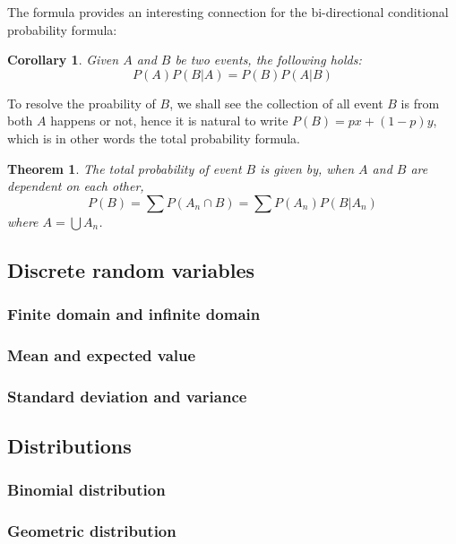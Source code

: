 \documentclass[12pt]{article}
\newtheorem*{theorem}{Theorem}
\newtheorem*{corollary}{Corollary}
\begin{document}
    The formula provides an interesting connection for the bi-directional conditional probability formula:

    \begin{corollary}
        Given $A$ and $B$ be two events, the following holds: \[P(A)P(B|A)=P(B)P(A|B)\]
    \end{corollary}

    To resolve the proability of $B$, we shall see the collection of all event $B$ is from both $A$ happens or not, hence it is natural to write $P(B)=px+(1-p)y$, which is in other words the total probability formula.

    \begin{theorem}
        The total probability of event $B$ is given by, when $A$ and $B$ are dependent on each other, \[P(B)=\sum P(A_n\cap B)=\sum P(A_n)P(B|A_n)\] where $A=\bigcup A_n$.
    \end{theorem}

    \subsection{Discrete random variables}

    \subsubsection*{Finite domain and infinite domain}

    \subsubsection*{Mean and expected value}

    \subsubsection*{Standard deviation and variance}

    \subsection{Distributions}

    \subsubsection*{Binomial distribution}

    \subsubsection*{Geometric distribution}
\end{document}
